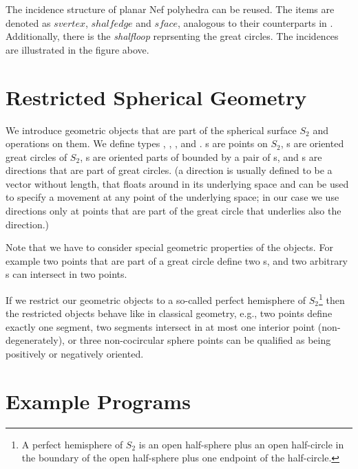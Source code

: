 The incidence structure of planar Nef polyhedra can be reused. The items
are denoted as $svertex$, $shalfedge$ and $sface$, analogous 
to their counterparts in . Additionally, there is the
\emph{shalfloop} reprsenting the great circles. The incidences are 
illustrated in the figure above.

\section{Restricted Spherical Geometry}

We introduce geometric objects that are part of the spherical surface
$S_2$ and operations on them. We define types ,
, , and .
s are points on $S_2$, s are
oriented great circles of $S_2$, s are oriented
parts of  bounded by a pair of
s, and s are directions that
are part of great circles. (a direction is usually defined to be a
vector without length, that floats around in its underlying space and
can be used to specify a movement at any point of the underlying
space; in our case we use directions only at points that are part of
the great circle that underlies also the direction.)

Note that we have to consider special geometric properties of the
objects. For example two points that are part of a great circle define
two s, and two arbitrary s can
intersect in two points.

If we restrict our geometric objects to a so-called perfect hemisphere
of $S_2$\footnote{A perfect hemisphere of $S_2$ is an open half-sphere
  plus an open half-circle in the boundary of the open half-sphere
  plus one endpoint of the half-circle.} then the restricted objects
behave like in classical geometry, e.g., two points define exactly one
segment, two segments intersect in at most one interior point
(non-degenerately), or three non-cocircular sphere points can be
qualified as being positively or negatively oriented.

\section{Example Programs}
\label{sectionNef_S2Examples}

